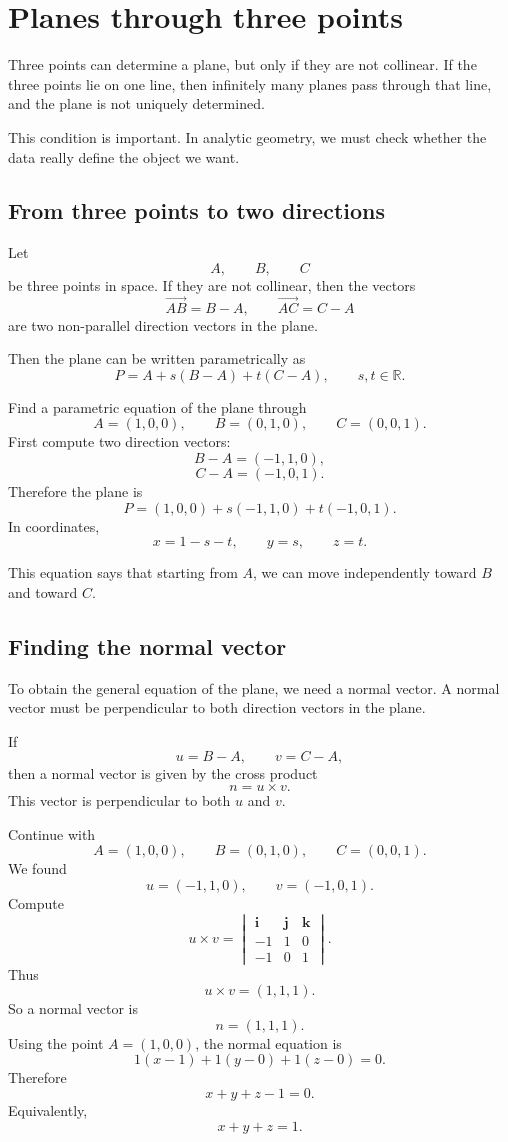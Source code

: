\section{Planes through three points}

Three points can determine a plane, but only if they are not collinear. If the three points lie on one line, then infinitely many planes pass through that line, and the plane is not uniquely determined.

This condition is important. In analytic geometry, we must check whether the data really define the object we want.

\subsection*{From three points to two directions}

Let
\[
A,
\qquad
B,
\qquad
C
\]
be three points in space. If they are not collinear, then the vectors
\[
\overrightarrow{AB}=B-A,
\qquad
\overrightarrow{AC}=C-A
\]
are two non-parallel direction vectors in the plane.

Then the plane can be written parametrically as
\[
P=A+s(B-A)+t(C-A),
\qquad s,t\in\mathbb{R}.
\]

\begin{examplebox}
Find a parametric equation of the plane through
\[
A=(1,0,0),
\qquad
B=(0,1,0),
\qquad
C=(0,0,1).
\]
First compute two direction vectors:
\[
B-A=(-1,1,0),
\]
\[
C-A=(-1,0,1).
\]
Therefore the plane is
\[
P=(1,0,0)+s(-1,1,0)+t(-1,0,1).
\]
In coordinates,
\[
x=1-s-t,
\qquad
y=s,
\qquad
z=t.
\]
\end{examplebox}

This equation says that starting from \(A\), we can move independently toward \(B\) and toward \(C\).

\subsection*{Finding the normal vector}

To obtain the general equation of the plane, we need a normal vector. A normal vector must be perpendicular to both direction vectors in the plane.

If
\[
u=B-A,
\qquad
v=C-A,
\]
then a normal vector is given by the cross product
\[
n=u\times v.
\]
This vector is perpendicular to both \(u\) and \(v\).

\begin{examplebox}
Continue with
\[
A=(1,0,0),
\qquad
B=(0,1,0),
\qquad
C=(0,0,1).
\]
We found
\[
u=(-1,1,0),
\qquad
v=(-1,0,1).
\]
Compute
\[
u\times v=
\begin{vmatrix}
\mathbf{i}&\mathbf{j}&\mathbf{k}\\
-1&1&0\\
-1&0&1
\end{vmatrix}.
\]
Thus
\[
u\times v=(1,1,1).
\]
So a normal vector is
\[
n=(1,1,1).
\]
Using the point \(A=(1,0,0)\), the normal equation is
\[
1(x-1)+1(y-0)+1(z-0)=0.
\]
Therefore
\[
x+y+z-1=0.
\]
Equivalently,
\[
x+y+z=1.
\]
\end{examplebox}

